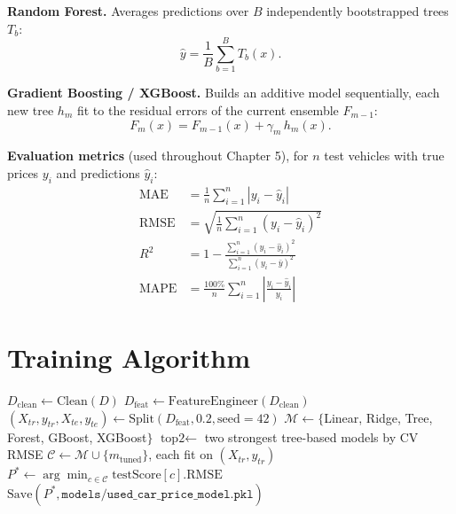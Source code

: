\documentclass[12pt,a4paper]{report}
\begin{document}
\textbf{Random Forest.} Averages predictions over $B$ independently
bootstrapped trees $T_b$:
\begin{equation}
\hat{y} = \frac{1}{B}\sum_{b=1}^{B} T_b(x).
\end{equation}

\textbf{Gradient Boosting / XGBoost.} Builds an additive model
sequentially, each new tree $h_m$ fit to the residual errors of the
current ensemble $F_{m-1}$:
\begin{equation}
F_m(x) = F_{m-1}(x) + \gamma_m\, h_m(x).
\end{equation}

\textbf{Evaluation metrics} (used throughout Chapter 5), for $n$ test
vehicles with true prices $y_i$ and predictions $\hat{y}_i$:
\begin{align}
\text{MAE} &= \frac{1}{n}\sum_{i=1}^{n}\left|y_i - \hat{y}_i\right| \\
\text{RMSE} &= \sqrt{\frac{1}{n}\sum_{i=1}^{n}\left(y_i - \hat{y}_i\right)^2} \\
R^2 &= 1 - \frac{\sum_{i=1}^{n}(y_i-\hat{y}_i)^2}{\sum_{i=1}^{n}(y_i-\bar{y})^2} \\
\text{MAPE} &= \frac{100\%}{n}\sum_{i=1}^{n}\left|\frac{y_i - \hat{y}_i}{y_i}\right|
\end{align}

\section*{Training Algorithm}
\begin{algorithm}[H]
\small
\SetAlgoLined
{}
$D_{\text{clean}} \leftarrow \text{Clean}(D)$ 
$D_{\text{feat}} \leftarrow \text{FeatureEngineer}(D_{\text{clean}})$ 
$(X_{tr}, y_{tr}, X_{te}, y_{te}) \leftarrow \text{Split}(D_{\text{feat}}, 0.2, \text{seed}{=}42)$\;
$\mathcal{M} \leftarrow \{$Linear, Ridge, Tree, Forest, GBoost, XGBoost$\}$\;
$\text{top2} \leftarrow$ two strongest tree-based models by CV RMSE\;
$\mathcal{C} \leftarrow \mathcal{M} \cup \{m_{\text{tuned}}\}$, each fit on $(X_{tr}, y_{tr})$\;
$P^* \leftarrow \arg\min_{c \in \mathcal{C}} \text{testScore}[c].\text{RMSE}$\;
$\text{Save}(P^*, \texttt{models/used\_car\_price\_model.pkl})$\;
\caption{Model Training, Comparison and Selection}
\end{algorithm}
\end{document}
